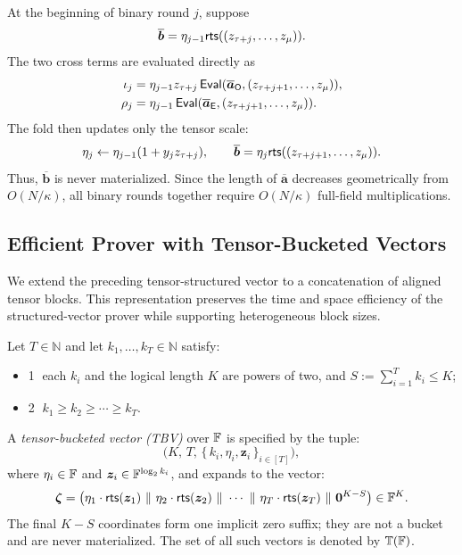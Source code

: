 At the beginning of binary round $j$, suppose
\[
    \overline{\bm b}
    =\eta_{j-1}
      {\sf rts}((z_{\tau+j},\ldots,z_\mu)).
\]
The two cross terms are evaluated directly as
\begin{align*}
    \iota_j
    &=\eta_{j-1}z_{\tau+j}\,
      {\sf Eval}(\overline{\bm a}_{\sf O},
            (z_{\tau+j+1},\ldots,z_\mu)), \\
    \rho_j
    &=\eta_{j-1}\,
      {\sf Eval}(\overline{\bm a}_{\sf E},
            (z_{\tau+j+1},\ldots,z_\mu)).
\end{align*}
The fold then updates only the tensor scale:
\begin{equation}
\label{eq:structured-b-fold}
    \eta_j
    \leftarrow\eta_{j-1}(1+y_j z_{\tau+j}),
    \qquad
    \overline{\bm b}
    =\eta_j
      {\sf rts}((z_{\tau+j+1},\ldots,z_\mu)).
\end{equation}
Thus, $\overline{\bm b}$ is never materialized.  Since the length of
$\overline{\bm a}$ decreases geometrically from $O(N/\kappa)$, all binary
rounds together require $O(N/\kappa)$ full-field multiplications.


\subsection{Efficient Prover with Tensor-Bucketed Vectors}

We extend the preceding tensor-structured vector to a concatenation of aligned
tensor blocks.  This representation preserves the time and space efficiency of
the structured-vector prover while supporting heterogeneous block sizes.

\begin{definition}
\label{def:tbv}
Let $T\in\mathbb{N}$ and let $k_1,\ldots,k_T\in\mathbb{N}$ satisfy:
\begin{itemize}[label={},leftmargin=0pt]
    \item \textcircled{1} each $k_i$ and the logical length $K$ are powers of
    two, and $S:=\sum_{i=1}^T k_i\le K$;
    \item \textcircled{2} $k_1\ge k_2\ge\cdots\ge k_T$.
\end{itemize}
A \emph{tensor-bucketed vector (TBV)} over ${\mathbb{F}}$ is specified by the tuple:
\[
\big(
K,\,
T,\,
\{\,k_i,\eta_i,\bm{z}_i\,\}_{i\in[T]}
\big),
\]
where $\eta_i\in{\mathbb{F}}$ and $\bm{z}_i\in{\mathbb{F}}^{\log_2 k_i}$,
and expands to the vector:
\[
\bm{\zeta}
=
\big(
\eta_1\cdot{\sf rts}(\bm{z}_1)
~\|~
\eta_2\cdot{\sf rts}(\bm{z}_2)
~\|~
\cdots
~\|~
\eta_T\cdot{\sf rts}(\bm{z}_T)
~\|~
\bm 0^{K-S}
\big)
\in{\mathbb{F}}^K .
\]
The final $K-S$ coordinates form one implicit zero suffix; they are not a
bucket and are never materialized.
The set of all such vectors is denoted by ${\mathbb{T}}({\mathbb{F}})$.
\end{definition}

